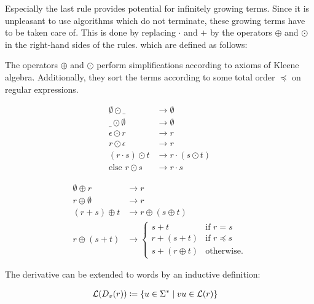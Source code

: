 Especially the last rule provides potential for infinitely growing terms.
Since it is unpleasant to use algorithms which do not terminate,
these growing terms have to be taken care of.
This is done by replacing $\cdot$ and $+$ by the operators $\oplus$ and $\odot$
in the right-hand sides of the rules.
which are defined as follows:

\begin{definition}
    The operators $\oplus$ and $\odot$ perform simplifications according to axioms of Kleene algebra.
    Additionally, they sort the terms according to some total order $\preceq$ on regular expressions.

    \begin{align}
        \emptyset \odot \_     &\rightarrow \emptyset \\
        \_ \odot \emptyset     &\rightarrow \emptyset \\
        \epsilon \odot r       &\rightarrow r \\
        r \odot \epsilon       &\rightarrow r \\
        (r \cdot s) \odot t    &\rightarrow r \cdot (s \odot t) \\
        \text{else } r \odot s &\rightarrow r \cdot s
    \end{align}

    \begin{align}
        \emptyset \oplus r &\rightarrow r \\
        r \oplus \emptyset &\rightarrow r \\
        (r + s) \oplus t   &\rightarrow r \oplus (s \oplus t) \\
        r \oplus (s + t)   &\rightarrow
        \begin{cases}
            s + t            & \text{if } r = s \\
            r + (s + t)      & \text{if } r \preceq s \\
            s + (r \oplus t) & \text{otherwise}.
        \end{cases}
    \end{align}
\end{definition}

\begin{definition}
    The derivative can be extended to words by an inductive definition:

    \begin{align}
        \label{def:derivative_wrt_words}
        \mathcal{L}(D_v(r)) &\coloneqq \{ u \in \Sigma^\ast \mid v u \in \mathcal{L}(r) \}
    \end{align}
\end{definition}

